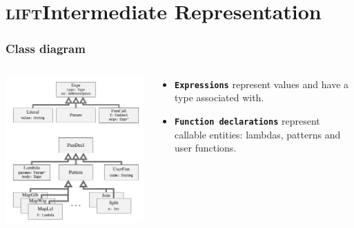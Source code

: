 \documentclass[10pt,usetotalslideindicator]{beamer}
\newcommand{\lift}{\textsc{lift}\space}
\newcommand{\code}[1]{\textbf{\texttt{#1}}}
\begin{document}
\section{\lift Intermediate Representation}

\begin{frame}
\frametitle{Class diagram}

    \begin{columns}[onlytextwidth]
\begin{column}{0.65\textwidth}
    \vspace{-.5cm}
    \begin{block}{}
        \begin{center}
            \includegraphics[width=\textwidth]{../images/class_diagram.pdf}
        \end{center}
    \end{block}
\end{column}
\begin{column}{0.35\textwidth}
    \vspace{-.5cm}
\begin{itemize}	
	\item \code{Expressions} represent values and have a type associated with.
\vspace{0.7cm}
	\item \code{Function declarations} represent callable entities: lambdas, patterns and user functions.
\end{itemize}
\end{column}
\end{columns}
\end{frame}
\end{document}
